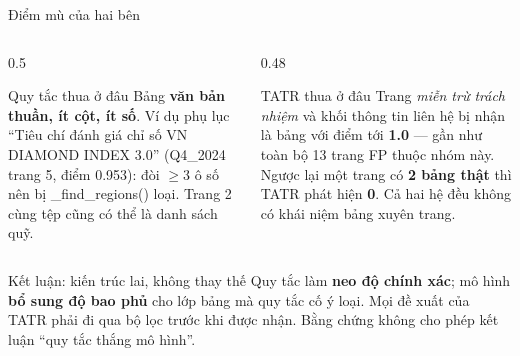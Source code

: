 \documentclass[aspectratio=169,11pt]{beamer}
\newcommand{\src}[1]{{\footnotesize\ttfamily #1}}
\begin{document}
\begin{frame}{Điểm mù của hai bên}
  \begin{columns}[T]
    \begin{column}{0.5\textwidth}
      \begin{alertblock}{\small Quy tắc thua ở đâu}
        Bảng \textbf{văn bản thuần, ít cột, ít số}. Ví dụ phụ lục ``Tiêu chí đánh
        giá chỉ số VN DIAMOND INDEX 3.0'' (\src{Q4\_2024} trang 5, điểm 0.953): đòi
        $\ge 3$ ô số nên bị \src{\_find\_regions()} loại. Trang 2 cùng tệp cũng
        có thể là danh sách quỹ.
      \end{alertblock}
    \end{column}
    \begin{column}{0.48\textwidth}
      \begin{block}{\small TATR thua ở đâu}
        Trang \emph{miễn trừ trách nhiệm} và khối thông tin liên hệ bị nhận là
        bảng với điểm tới \textbf{1.0} --- gần như toàn bộ 13 trang FP thuộc nhóm
        này. Ngược lại một trang có \textbf{2 bảng thật} thì TATR phát hiện \textbf{0}.
        Cả hai hệ đều không có khái niệm bảng xuyên trang.
      \end{block}
    \end{column}
  \end{columns}
  \vspace{0.4em}
  \begin{block}{\small Kết luận: kiến trúc lai, không thay thế}
    Quy tắc làm \textbf{neo độ chính xác}; mô hình \textbf{bổ sung độ bao phủ}
    cho lớp bảng mà quy tắc cố ý loại. Mọi đề xuất của TATR phải đi qua bộ lọc
    trước khi được nhận. Bằng chứng không cho phép kết luận ``quy tắc thắng mô hình''.
  \end{block}
\end{frame}
\end{document}
